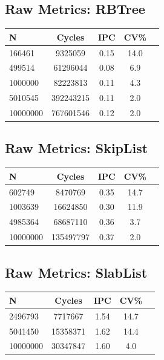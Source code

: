 \subsection*{Raw Metrics: RBTree}
\begin{table}[H]
\centering
{}
\begin{tabular}{@{}lcccc@{}}
\toprule
\rowcolor{teal!20} N & Cycles & IPC & CV\% \\ \midrule
166461 & 9325059 & 0.15 & 14.0 \\ 
499514 & 61296044 & 0.08 & 6.9 \\ 
1000000 & 82223813 & 0.11 & 4.3 \\ 
5010545 & 392243215 & 0.11 & 2.0 \\ 
10000000 & 767601546 & 0.12 & 2.0 \\ 
\bottomrule
\end{tabular}
\end{table}

\clearpage
\subsection*{Raw Metrics: SkipList}
\begin{table}[H]
\centering
{}
\begin{tabular}{@{}lcccc@{}}
\toprule
\rowcolor{teal!20} N & Cycles & IPC & CV\% \\ \midrule
602749 & 8470769 & 0.35 & 14.7 \\ 
1003639 & 16624850 & 0.30 & 11.9 \\ 
4985364 & 68687110 & 0.36 & 3.7 \\ 
10000000 & 135497797 & 0.37 & 2.0 \\ 
\bottomrule
\end{tabular}
\end{table}

\subsection*{Raw Metrics: SlabList}
\begin{table}[H]
\centering
{}
\begin{tabular}{@{}lcccc@{}}
\toprule
\rowcolor{teal!20} N & Cycles & IPC & CV\% \\ \midrule
2496793 & 7717667 & 1.54 & 14.7 \\ 
5041450 & 15358371 & 1.62 & 14.4 \\ 
10000000 & 30347847 & 1.60 & 4.0 \\ 
\bottomrule
\end{tabular}
\end{table}

